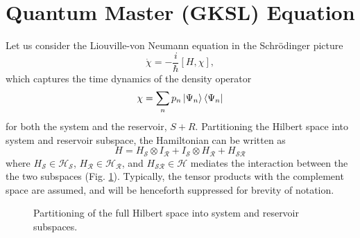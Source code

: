 \section{Quantum Master (GKSL) Equation}
%
%
Let us consider the Liouville-von Neumann equation in the Schr\"{o}dinger picture
\begin{equation}\label{Liouville-von Neumann}
\dot{\chi} = - \frac{i}{\hbar} [H , \chi],
\end{equation}
which captures the time dynamics of the density operator
\begin{equation}
\chi = \sum_n p_n \left|\Psi_n \right\rangle\left\langle \Psi_n \right|
\end{equation}
for both the system and the reservoir, $S+R$. Partitioning the Hilbert space into system and reservoir subspace, the Hamiltonian can be written as 
%
\begin{equation}
H = H_{\mathcal{S}}\otimes I_{\mathcal{R}} + I_{\mathcal{S}} \otimes H_{\mathcal{R}}+ H_{\mathcal{SR}}
\end{equation}
%
where $H_{\mathcal{S}} \in \mathcal{H}_{\mathcal{S}}$, $H_{\mathcal{R}} \in \mathcal{H}_{\mathcal{R}}$, and $H_{\mathcal{SR}}\in \mathcal{H}$ mediates the interaction between the the two subspaces (Fig. \ref{Hilbert_Space}). Typically, the tensor products with the complement space are assumed, and will be henceforth suppressed for brevity of notation.
%
\begin{figure}
\centering
{}
\caption{Partitioning of the full Hilbert space into system and reservoir subspaces.}
\label{Hilbert_Space}
\end{figure}
